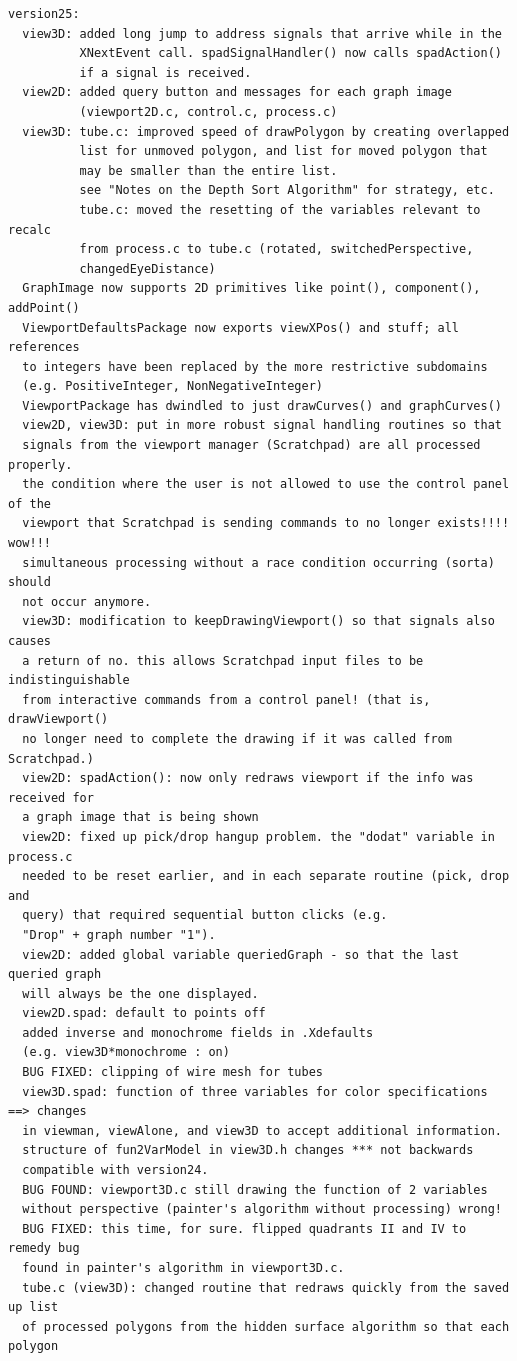 \documentclass{article}
\begin{document}
\begin{verbatim}
version25:
  view3D: added long jump to address signals that arrive while in the
          XNextEvent call. spadSignalHandler() now calls spadAction()
          if a signal is received.
  view2D: added query button and messages for each graph image
          (viewport2D.c, control.c, process.c)
  view3D: tube.c: improved speed of drawPolygon by creating overlapped
          list for unmoved polygon, and list for moved polygon that
          may be smaller than the entire list.
          see "Notes on the Depth Sort Algorithm" for strategy, etc.
          tube.c: moved the resetting of the variables relevant to recalc
          from process.c to tube.c (rotated, switchedPerspective,
          changedEyeDistance)
  GraphImage now supports 2D primitives like point(), component(), addPoint()
  ViewportDefaultsPackage now exports viewXPos() and stuff; all references
  to integers have been replaced by the more restrictive subdomains
  (e.g. PositiveInteger, NonNegativeInteger)
  ViewportPackage has dwindled to just drawCurves() and graphCurves()
  view2D, view3D: put in more robust signal handling routines so that
  signals from the viewport manager (Scratchpad) are all processed properly.
  the condition where the user is not allowed to use the control panel of the
  viewport that Scratchpad is sending commands to no longer exists!!!! wow!!!
  simultaneous processing without a race condition occurring (sorta) should
  not occur anymore.
  view3D: modification to keepDrawingViewport() so that signals also causes
  a return of no. this allows Scratchpad input files to be indistinguishable
  from interactive commands from a control panel! (that is, drawViewport()
  no longer need to complete the drawing if it was called from Scratchpad.)
  view2D: spadAction(): now only redraws viewport if the info was received for
  a graph image that is being shown
  view2D: fixed up pick/drop hangup problem. the "dodat" variable in process.c
  needed to be reset earlier, and in each separate routine (pick, drop and
  query) that required sequential button clicks (e.g.
  "Drop" + graph number "1").
  view2D: added global variable queriedGraph - so that the last queried graph
  will always be the one displayed.
  view2D.spad: default to points off
  added inverse and monochrome fields in .Xdefaults
  (e.g. view3D*monochrome : on)
  BUG FIXED: clipping of wire mesh for tubes
  view3D.spad: function of three variables for color specifications ==> changes
  in viewman, viewAlone, and view3D to accept additional information.
  structure of fun2VarModel in view3D.h changes *** not backwards
  compatible with version24.
  BUG FOUND: viewport3D.c still drawing the function of 2 variables
  without perspective (painter's algorithm without processing) wrong!
  BUG FIXED: this time, for sure. flipped quadrants II and IV to remedy bug
  found in painter's algorithm in viewport3D.c.
  tube.c (view3D): changed routine that redraws quickly from the saved up list
  of processed polygons from the hidden surface algorithm so that each polygon


\end{verbatim}
\end{document}
